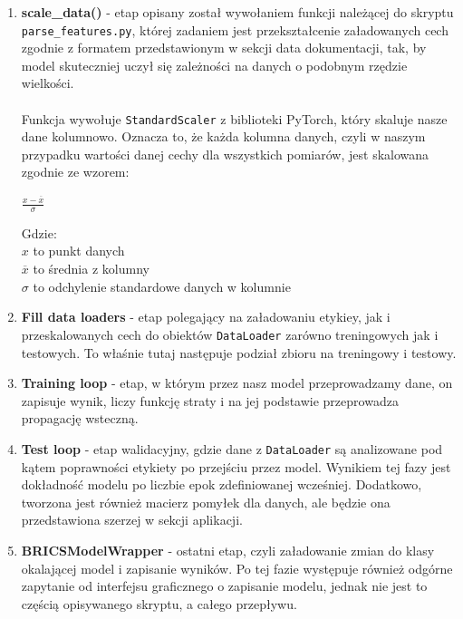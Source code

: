 \begin{enumerate}
    \item \textbf{scale\_data()} - etap opisany został wywołaniem funkcji należącej do skryptu
    \texttt{parse\_features.py}, której zadaniem jest przekształcenie załadowanych cech zgodnie
    z formatem przedstawionym w sekcji data dokumentacji, tak, by model skuteczniej uczył
    się zależności na danych o podobnym rzędzie wielkości.\\\\
    Funkcja wywołuje \texttt{StandardScaler} z biblioteki PyTorch, który skaluje nasze dane
    kolumnowo. Oznacza to, że każda kolumna danych, czyli w naszym przypadku wartości danej
    cechy dla wszystkich pomiarów, jest skalowana zgodnie ze wzorem:
    \begin{center}
        \begingroup
        \Huge
        \( \frac{x - \overline{x}}{\sigma} \)
        \endgroup
    \end{center}
    Gdzie:
    \\\( x \) to punkt danych
    \\\( \overline{x} \) to średnia z kolumny
    \\\( \sigma \) to odchylenie standardowe danych w kolumnie

    \item \textbf{Fill data loaders} - etap polegający na załadowaniu etykiey, jak i
    przeskalowanych cech do obiektów \texttt{DataLoader} zarówno treningowych jak i testowych.
    To właśnie tutaj następuje podział zbioru na treningowy i testowy.

    \item \textbf{Training loop} - etap, w którym przez nasz model przeprowadzamy dane,
    on zapisuje wynik, liczy funkcję straty i na jej podstawie przeprowadza propagację wsteczną.

    \item \textbf{Test loop} - etap walidacyjny, gdzie dane z \texttt{DataLoader} są analizowane
    pod kątem poprawności etykiety po przejściu przez model. Wynikiem tej fazy jest dokładność
    modelu po liczbie epok zdefiniowanej wcześniej. Dodatkowo, tworzona jest również macierz
    pomyłek dla danych, ale będzie ona przedstawiona szerzej w sekcji aplikacji.

    \item \textbf{BRICSModelWrapper} - ostatni etap, czyli załadowanie zmian do klasy okalającej
    model i zapisanie wyników. Po tej fazie występuje również odgórne zapytanie od interfejsu
    graficznego o zapisanie modelu, jednak nie jest to częścią opisywanego skryptu, a całego przepływu.
\end{enumerate}

